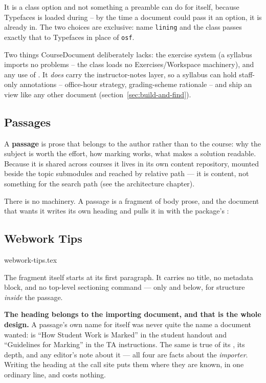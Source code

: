 \noindent It is a class option and not something a preamble can do for
itself, because Typefaces is loaded during  -- by the
time a document could pass it an option, it is already in. The two
choices are exclusive: name \texttt{lining} and the class passes exactly
that to Typefaces in place of \texttt{osf}.

Two things CourseDocument deliberately lacks: the exercise system (a
syllabus imports no problems -- the class loads no Exercises/Workspace
machinery), and any use of . It \emph{does} carry the
instructor-notes layer, so a syllabus can hold staff-only annotations --
office-hour strategy, grading-scheme rationale -- and ship an
 view like any other document
(section~\ref{sec:build-and-find}).

\subsection{Passages}\label{sec:ch5-passages}

A \textbf{passage} is prose that belongs to the author rather than to the
course: why the subject is worth the effort, how marking works, what makes a
solution readable. Because it is shared across courses it lives in its own
content repository, mounted beside the topic submodules and reached by
relative path --- it is content, not something for the search path (see the architecture chapter).

There is no machinery. A passage is a  fragment of body prose, and
the document that wants it writes its own heading and pulls it in with the
 package's :

\begin{manexsource}
\section{Webwork Tips}\label{sec:webwork_tips}

{webwork-tips.tex}
\end{manexsource}

\noindent The fragment itself starts at its first paragraph. It carries no
title, no metadata block, and no top-level sectioning command --- only
 and below, for structure \emph{inside} the passage.

\textbf{The heading belongs to the importing document, and that is the whole
design.} A passage's own name for itself was never quite the name a document
wanted:  is ``How Student Work is Marked'' in the
student handout and ``Guidelines for Marking'' in the TA instructions. The
same is true of its , its depth, and any editor's note about it ---
all four are facts about the \emph{importer}. Writing the heading at the call
site puts them where they are known, in one ordinary line, and costs nothing.

